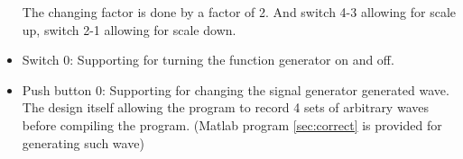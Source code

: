 \documentclass[11pt]{scrartcl}
\begin{document}
\begin{itemize}
    The changing factor is done by a factor of 2. And switch 4-3 allowing for scale up, switch 2-1 allowing for scale down.
    
    \item Switch 0:
    Supporting for turning the function generator on and off.
    
    \item Push button 0:
    Supporting for changing the signal generator generated wave. The design itself allowing the program to record 4 sets of arbitrary waves before compiling the program. (Matlab program \ref{sec:correct} is provided for generating such wave) 
\end{itemize}
\end{document}
